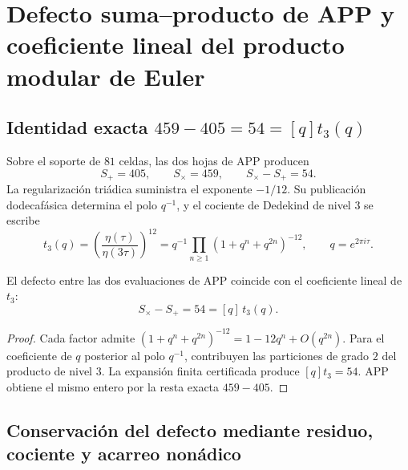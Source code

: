 
\section{Defecto suma--producto de APP y coeficiente lineal del producto modular de Euler}
\label{sec:l9s102:euler-defecto}

\subsection{Identidad exacta \texorpdfstring{\(459-405=54=[q]t_3(q)\)}{459-405=54=[q]t3(q)}}

Sobre el soporte de \(81\) celdas, las dos hojas de APP producen
\begin{equation}
 S_+=405,
 \qquad
 S_\times=459,
 \qquad
 S_\times-S_+=54.
 \label{eq:l9s102:euler-405-459}
\end{equation}
La regularización triádica suministra el exponente \(-1/12\). Su
publicación dodecafásica determina el polo \(q^{-1}\), y el cociente de
Dedekind de nivel \(3\) se escribe
\begin{equation}
 t_3(q)
 =\left(\frac{\eta(\tau)}{\eta(3\tau)}\right)^{12}
 =q^{-1}\prod_{n\ge1}(1+q^n+q^{2n})^{-12},
 \qquad q=e^{2\pi i\tau}.
 \label{eq:l9s102:euler-t3}
\end{equation}

\begin{theorem}
\label{thm:l9s102:euler-54}
El defecto entre las dos evaluaciones de APP coincide con el coeficiente
lineal de \(t_3\):
\begin{equation}
 \boxed{
 S_\times-S_+=54=[q]\,t_3(q).}
 \label{eq:l9s102:euler-54}
\end{equation}
\end{theorem}

\begin{proof}
Cada factor admite
\((1+q^n+q^{2n})^{-12}=1-12q^n+O(q^{2n})\). Para el coeficiente de
\(q\) posterior al polo \(q^{-1}\), contribuyen las particiones de grado
\(2\) del producto de nivel \(3\). La expansión finita certificada produce
\([q]t_3=54\). APP obtiene el mismo entero por la resta exacta
\(459-405\).
\end{proof}

\subsection{Conservación del defecto mediante residuo, cociente y acarreo nonádico}

